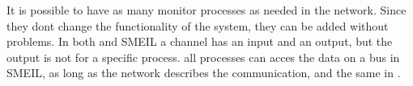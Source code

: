 It is possible to have as many monitor processes as needed in the network. Since they dont change the functionality of the system, they can be added without problems. In both \cspm and SMEIL a channel has an input and an output, but the output is not for a specific process. all processes can acces the data on a bus in SMEIL, as long as the network describes the communication, and the same in \cspm.






%
